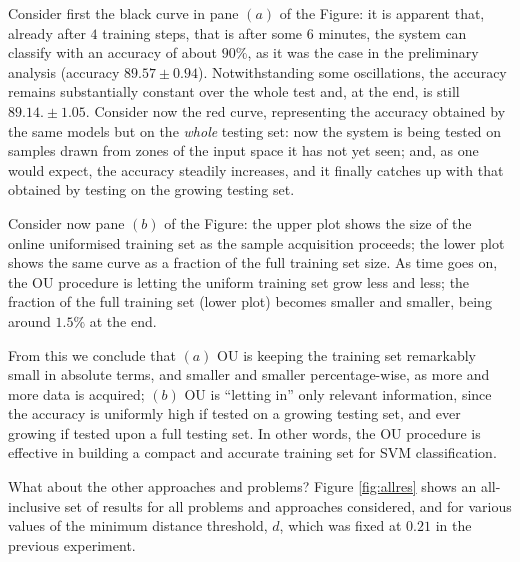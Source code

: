 Consider first the black curve in pane $(a)$ of the Figure: it is
apparent that, already after $4$ training steps, that is after some
$6$ minutes, the system can classify with an accuracy of about $90\%$,
as it was the case in the preliminary analysis (accuracy $89.57 \pm
0.94$). Notwithstanding some oscillations, the accuracy remains
substantially constant over the whole test and, at the end, is still
$89.14. \pm 1.05$. Consider now the red curve, representing the
accuracy obtained by the same models but on the \emph{whole} testing
set: now the system is being tested on samples drawn from zones of the
input space it has not yet seen; and, as one would expect, the
accuracy steadily increases, and it finally catches up with that
obtained by testing on the growing testing set.

Consider now pane $(b)$ of the Figure: the upper plot shows the size
of the online uniformised training set as the sample acquisition
proceeds; the lower plot shows the same curve as a fraction of the
full training set size. As time goes on, the OU procedure is letting
the uniform training set grow less and less; the fraction of the full
training set (lower plot) becomes smaller and smaller, being around
$1.5\%$ at the end.

From this we conclude that $(a)$ OU is keeping the training set
remarkably small in absolute terms, and smaller and smaller
percentage-wise, as more and more data is acquired; $(b)$ OU is
``letting in'' only relevant information, since the accuracy is
uniformly high if tested on a growing testing set, and ever growing if
tested upon a full testing set. In other words, the OU procedure is
effective in building a compact and accurate training set for SVM
classification.

What about the other approaches and problems? Figure \ref{fig:allres}
shows an all-inclusive set of results for all problems and approaches
considered, and for various values of the minimum distance threshold,
$d$, which was fixed at $0.21$ in the previous experiment.

